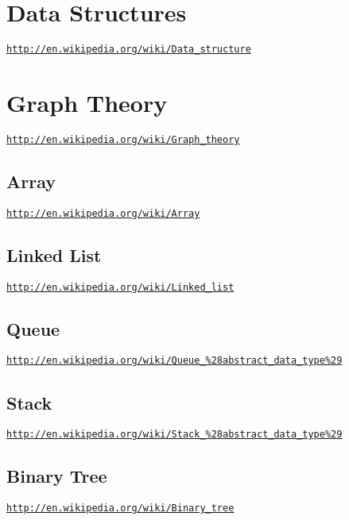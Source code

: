 \hypertarget{page1_sec0}{}\section{Data Structures}\label{page1_sec0}
\href{http://en.wikipedia.org/wiki/Data_structure}{\tt http\-://en.\-wikipedia.\-org/wiki/\-Data\-\_\-structure} \hypertarget{page1_sec1}{}\section{Graph Theory}\label{page1_sec1}
\href{http://en.wikipedia.org/wiki/Graph_theory}{\tt http\-://en.\-wikipedia.\-org/wiki/\-Graph\-\_\-theory} \hypertarget{page1_subsection1}{}\subsection{Array}\label{page1_subsection1}
\href{http://en.wikipedia.org/wiki/Array}{\tt http\-://en.\-wikipedia.\-org/wiki/\-Array} \hypertarget{page1_subsection2}{}\subsection{Linked List}\label{page1_subsection2}
\href{http://en.wikipedia.org/wiki/Linked_list}{\tt http\-://en.\-wikipedia.\-org/wiki/\-Linked\-\_\-list} \hypertarget{page1_subsection3}{}\subsection{Queue}\label{page1_subsection3}
\href{http://en.wikipedia.org/wiki/Queue_%28abstract_data_type%29}{\tt http\-://en.\-wikipedia.\-org/wiki/\-Queue\-\_\-\%28abstract\-\_\-data\-\_\-type\%29} \hypertarget{page1_subsection4}{}\subsection{Stack}\label{page1_subsection4}
\href{http://en.wikipedia.org/wiki/Stack_%28abstract_data_type%29}{\tt http\-://en.\-wikipedia.\-org/wiki/\-Stack\-\_\-\%28abstract\-\_\-data\-\_\-type\%29} \hypertarget{page1_subsection5}{}\subsection{Binary Tree}\label{page1_subsection5}
\href{http://en.wikipedia.org/wiki/Binary_tree}{\tt http\-://en.\-wikipedia.\-org/wiki/\-Binary\-\_\-tree} 
